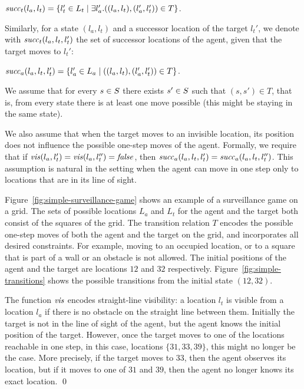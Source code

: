 $\mathit{succ}_t(l_a,l_t) = \{l_t' \in L_t \mid \exists l_a'. ((l_a,l_t),(l_a',l_t')) \in T\}$.

Similarly, for a state $(l_a,l_t)$ and a successor location of the target $l_t'$, we denote with $\mathit{succ}_t(l_a,l_t,l_t')$ the set of successor locations of the agent, given that the target moves to $l_t'$: 

$\mathit{succ}_a(l_a,l_t,l_t') = \{l_a' \in L_a \mid  ((l_a,l_t),(l_a',l_t')) \in T\}$.

We assume that for every $s \in S$ there exists $s' \in S$ such that $(s,s') \in T$, that is, from every state there is at least one move possible (this might be staying in the same state).

We also assume that when the target moves to an invisible location, its position does not influence the possible one-step moves of the agent. Formally, we require that if $\mathit{vis}(l_a,l_t') = \mathit{vis}(l_a,l_t'')=\mathit{false}$, then $\mathit{succ}_a(l_a,l_t,l_t') = \mathit{succ}_a(l_a,l_t,l_t'')$. This assumption is natural in the setting when the agent can move in one step only to locations that are in its line of sight.

\begin{example}\label{ex:simple-surveillance-game}
Figure~\ref{fig:simple-surveillance-game} shows an example of a surveillance game on a grid.  The sets of possible locations $L_a$ and $L_t$ for the agent and the target both consist of the squares of the  grid. The transition relation $T$ encodes the possible one-step moves of both the agent and the target on the grid, and incorporates all desired constraints. For example, moving to an occupied location, or to a square that is part of a wall or an obstacle is not allowed. The initial positions of the agent and the target are locations $12$ and $32$ respectively. Figure~\ref{fig:simple-transitions} shows the possible transitions from the initial state $(12,32)$.

The function $\mathit{vis}$ encodes straight-line visibility: a location $l_t$ is visible from a location $l_a$ if there is no obstacle on the straight line between them. Initially the target is not in the line of sight of the agent, but the agent knows the initial position of the target. However, once the target moves to one of the locations reachable in one step, in this case, locations $\{31,33,39\}$, this might no longer be the case. More precisely, if the target moves to $33$, then the agent observes its location, but if it moves to one of $31$ and $39$, then the agent no longer knows its exact location. \qed
\end{example}




